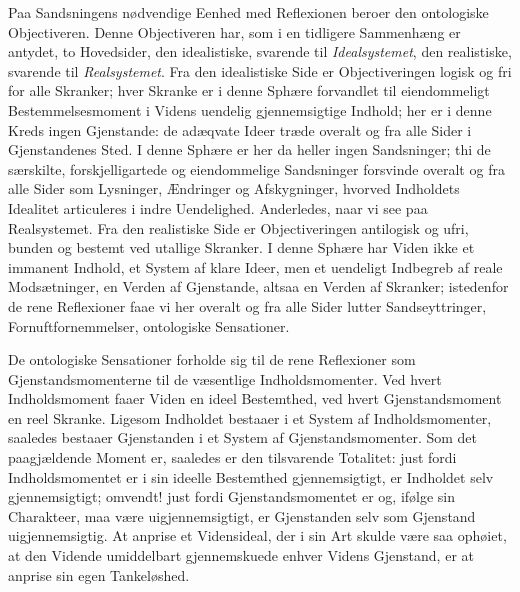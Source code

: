\documentclass[11pt]{book}
\newcommand{\opage}[1]{\marginnote{\footnotesize\textit{[#1]}}}
\begin{document}
Paa Sandsningens nødvendige Eenhed med Reflexionen beroer den
ontologiske Objectiveren. Denne Objectiveren har, som i en tidligere
Sammenhæng er antydet, to Hovedsider, den idealistiske, svarende til
\emph{Idealsystemet}, den realistiske, svarende til
\emph{Realsystemet}. Fra den idealistiske Side er Objectiveringen
logisk og fri for alle Skranker; hver Skranke er i denne Sphære
forvandlet til eiendommeligt Bestemmelsesmoment i Videns uendelig
gjennemsigtige Indhold; her er i denne Kreds ingen Gjenstande: de
adæqvate Ideer træde overalt og fra alle Sider i Gjenstandenes Sted.
I denne Sphære er her da heller ingen Sandsninger; thi de særskilte,
forskjelligartede og eiendommelige Sandsninger forsvinde overalt og
fra alle Sider som Lysninger, Ændringer og Afskygninger, hvorved
Indholdets Idealitet articuleres i indre Uendelighed. Anderledes,
naar vi see paa Realsystemet. Fra den realistiske Side er
Objectiveringen antilogisk og ufri, bunden og bestemt ved utallige
Skranker. I denne Sphære har Viden ikke et immanent Indhold, et
System af klare Ideer, men et uendeligt Indbegreb af reale
Modsætninger, en Verden af Gjenstande, altsaa en Verden af Skranker;
istedenfor de rene Reflexioner faae vi her overalt og fra alle Sider
lutter Sandseyttringer, Fornuftfornemmelser, ontologiske Sensationer.

De ontologiske Sensationer forholde sig til de rene Reflexioner som
Gjenstandsmomenterne til de væsentlige Indholdsmomenter. Ved hvert
Indholdsmoment faaer Viden en ideel Bestemthed, ved hvert
Gjenstandsmoment en reel Skranke. Ligesom Indholdet bestaaer i et
System af
\opage{261} \setcounter{footnote}{0}%
Indholdsmomenter, saaledes bestaaer Gjenstanden i et System af
Gjenstandsmomenter. Som det paagjældende Moment er, saaledes er den
tilsvarende Totalitet: just fordi Indholdsmomentet er i sin ideelle
Bestemthed gjennemsigtigt, er Indholdet selv gjennemsigtigt; omvendt!
just fordi Gjenstandsmomentet er og, ifølge sin Charakteer, maa være
uigjennemsigtigt, er Gjenstanden selv som Gjenstand uigjennemsigtig.
At anprise et Vidensideal, der i sin Art skulde være saa ophøiet, at
den Vidende umiddelbart gjennemskuede enhver Videns Gjenstand, er at
anprise sin egen Tankeløshed.
\end{document}
